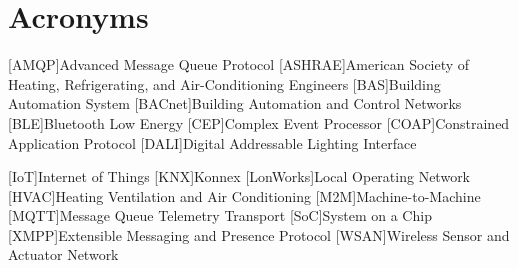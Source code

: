 \chapter{Acronyms}

\footnotesize
\SingleSpacing

\begin{multicols}{2}
\begin{acronym}[AAAAAA]

	[AMQP]{Advanced Message Queue Protocol}
	[ASHRAE]{American Society of Heating, Refrigerating, and Air-Conditioning Engineers}
	[BAS]{Building Automation System}
	[BACnet]{Building Automation and Control Networks}
	[BLE]{Bluetooth Low Energy}
	[CEP]{Complex Event Processor}
	[COAP]{Constrained Application Protocol}
	[DALI]{Digital Addressable Lighting Interface}
	
	[IoT]{Internet of Things}
	[KNX]{Konnex}
	[LonWorks]{Local Operating Network}
	[HVAC]{Heating Ventilation and Air Conditioning}
	[M2M]{Machine-to-Machine}
	[MQTT]{Message Queue Telemetry Transport}
	[SoC]{System on a Chip}
	[XMPP]{Extensible Messaging and Presence Protocol}
	[WSAN]{Wireless Sensor and Actuator Network}
	


\end{acronym}
\end{multicols}

